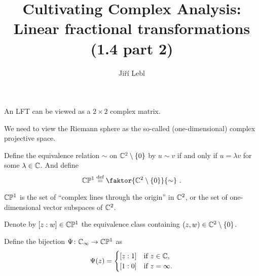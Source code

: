 \documentclass[10pt,aspectratio=169]{beamer}
\author{Ji\v{r}\'i Lebl}
\institute[OSU]{%
Departemento pri Matematiko de Oklahoma {\^S}tata Universitato}
\title{Cultivating Complex Analysis:\\%
Linear fractional transformations (1.4 part 2)}
\date{}
\begin{document}
\begin{frame}
\titlepage
\end{frame}

\begin{frame}
An LFT can be viewed as a $2 \times 2$ complex matrix.

\medskip
\pause

We need to view the Riemann sphere as the so-called (one-dimensional)
complex projective space.

\medskip
\pause

Define the equivalence relation $\sim$ on ${\mathbb{C}}^2 \setminus \{ 0 \}$ by
$u \sim v$ if and only if $u = \lambda v$ for some $\lambda \in {\mathbb{C}}$.
And define
\[
\C \bP^1
\overset{\text{def}}{=}
\faktor{\C^2 \setminus \{ 0\}}{\sim} \ .
\]

\pause

${\mathbb{C}} {\mathbb{P}}^1$ is the set of ``complex lines through the
origin'' in ${\mathbb{C}}^2$, or the set of one-dimensional vector subspaces of ${\mathbb{C}}^2$.

\medskip
\pause

Denote by $[z:w] \in {\mathbb{C}} {\mathbb{P}}^1$ the equivalence class containing
$(z,w) \in {\mathbb{C}}^2 \setminus \{0\}$.

\medskip
\pause

Define the bijection $\Psi \colon {\mathbb{C}}_\infty \to {\mathbb{C}} {\mathbb{P}}^1$ as
\begin{equation*}
\Psi(z) =
\begin{cases}
[z:1] & \text{if } z \in {\mathbb{C}} , \\
[1:0] & \text{if } z=\infty .
\end{cases}
\end{equation*}

\end{frame}
\end{document}
